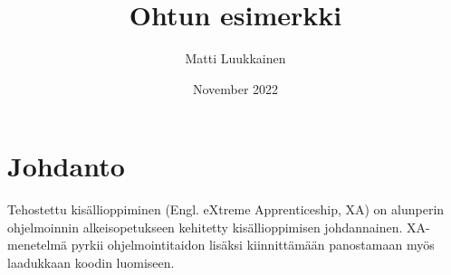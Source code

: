 \documentclass{article}
\title{Ohtun esimerkki}
\author{Matti Luukkainen}
\date{November 2022}
\begin{document}
\maketitle

\section{Johdanto}

Tehostettu kisällioppiminen \cite{Jaakko2024} (Engl. eXtreme Apprenticeship, XA) on
alunperin ohjelmoinnin alkeisopetukseen kehitetty kisällioppimisen \cite{Mikko2023}
johdannainen. XA-menetelmä pyrkii ohjelmointitaidon lisäksi kiinnittämään 
panostamaan myös laadukkaan koodin \cite{Anna2022} luomiseen. 

 

\end{document}
